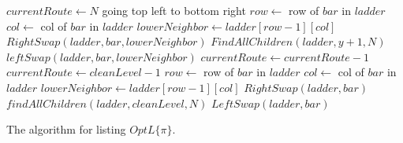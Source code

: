 \begin{algorithm}
	\begin{algorithmic}[1]
			\State $currentRoute \gets N$
				\State going top left to bottom right 
					\State $row \gets$ row of $bar$ in $ladder$ 
					\State $col \gets$ col of $bar$ in $ladder$
					\State $lowerNeighbor \gets ladder[row-1][col]$
						\State $RightSwap(ladder, bar, lowerNeighbor)$
						\State $FindAllChildren(ladder, y+1, N)$
						\State $leftSwap(ladder, bar, lowerNeighbor)$
					\EndIf
				\EndFor
				\State $currentRoute \gets currentRoute-1$
			\EndWhile
			\State $currentRoute \gets cleanLevel-1$
				\State $row \gets$ row of $bar$ in $ladder$ 
				\State $col \gets$ col of $bar$ in $ladder$
				\State $lowerNeighbor \gets ladder[row-1][col]$
					\State $RightSwap(ladder, bar)$
					\State $findAllChildren(ladder, cleanLevel, N)$
					\State $LeftSwap(ladder, bar)$
				\EndIf
			\EndFor
		\EndFunction
	\end{algorithmic}
	\caption{The algorithm for listing $OptL\{\pi\}$.}
	\label{Alg:FindAllChildren}
\end{algorithm}


